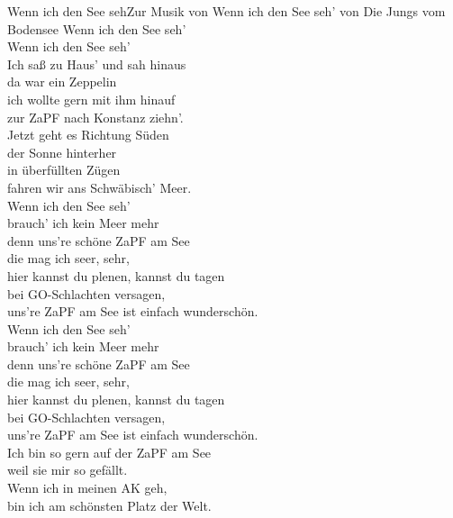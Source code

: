 
\begin{lied}{Wenn ich den See seh}{Zur Musik von Wenn ich den See seh' von Die Jungs vom Bodensee}
\vspace{1em}
Wenn ich den See seh'\\
Wenn ich den See seh'\\
\vspace{1em}
Ich saß zu Haus' und sah hinaus\\
da war ein Zeppelin\\
ich wollte gern mit ihm hinauf\\
zur ZaPF nach Konstanz ziehn'.\\
\vspace{1em}
Jetzt geht es Richtung Süden\\
der Sonne hinterher\\
in überfüllten Zügen\\
fahren wir ans Schwäbisch' Meer.\\
\vspace{1em}
Wenn ich den See seh'\\
brauch' ich kein Meer mehr\\
denn uns're schöne ZaPF am See\\
die mag ich seer, sehr,\\
hier kannst du plenen, kannst du tagen\\
bei GO-Schlachten versagen,\\
uns're ZaPF am See ist einfach wunderschön.\\
\vspace{1em}
Wenn ich den See seh'\\
brauch' ich kein Meer mehr\\
denn uns're schöne ZaPF am See\\
die mag ich seer, sehr,\\
hier kannst du plenen, kannst du tagen\\
bei GO-Schlachten versagen,\\
uns're ZaPF am See ist einfach wunderschön.\\
\vspace{1em}
Ich bin so gern auf der ZaPF am See\\
weil sie mir so gefällt.\\
Wenn ich in meinen AK geh,\\
bin ich am schönsten Platz der Welt.\\
\vspace{1em}

\end{lied}
